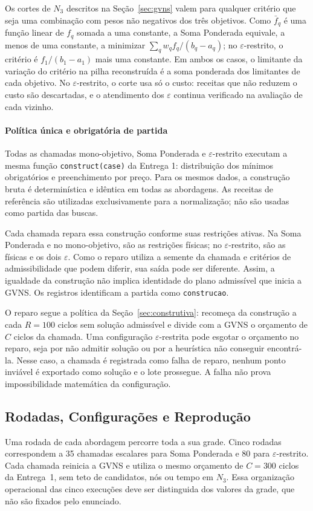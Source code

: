 \documentclass[conference]{IEEEtran}
\newcommand{\Cparada}{300}
\begin{document}
Os cortes de $N_3$ descritos na Seção~\ref{sec:gvns} valem para qualquer
critério que seja uma combinação com pesos não negativos dos três objetivos.
Como $\bar f_q$ é uma função linear de $f_q$ somada a uma constante, a Soma Ponderada equivale, a menos de uma
constante, a minimizar $\sum_q w_q f_q/(b_q-a_q)$; no $\varepsilon$-restrito,
o critério é $f_1/(b_1-a_1)$ mais uma constante. Em ambos os casos, o
limitante da variação do critério na pilha reconstruída é a soma ponderada
dos limitantes de cada objetivo. No $\varepsilon$-restrito, o corte usa só o
custo: receitas que não reduzem o custo são descartadas, e o atendimento dos
$\varepsilon$ continua verificado na avaliação de cada vizinho.

\paragraph{Política única e obrigatória de partida}
Todas as chamadas mono-objetivo, Soma Ponderada e $\varepsilon$-restrito
executam a mesma função \texttt{construct(case)} da Entrega 1: distribuição
dos mínimos obrigatórios e preenchimento por preço. Para os mesmos dados,
a construção bruta é determinística e idêntica em todas as abordagens.
As receitas de referência são utilizadas exclusivamente para a normalização;
não são usadas como partida das buscas.

Cada chamada repara essa construção conforme suas restrições ativas.
Na Soma Ponderada e no mono-objetivo, são as restrições físicas; no
$\varepsilon$-restrito, são as físicas e os dois $\varepsilon$.
Como o reparo utiliza a semente da chamada e critérios de admissibilidade
que podem diferir, sua saída pode ser diferente. Assim, a igualdade da
construção não implica identidade do plano admissível que inicia a GVNS.
Os registros identificam a partida como \texttt{construcao}.

O reparo segue a política da Seção~\ref{sec:construtiva}: recomeça da
construção a cada $R=100$ ciclos sem solução admissível e divide com a GVNS
o orçamento de $C$ ciclos da chamada. Uma configuração $\varepsilon$-restrita
pode esgotar o orçamento no reparo, seja por não admitir solução ou por a
heurística não conseguir encontrá-la. Nesse caso, a chamada é registrada como
falha de reparo, nenhum ponto inviável é exportado como solução e o lote
prossegue. A falha não prova impossibilidade matemática da configuração.

\subsection{Rodadas, Configurações e Reprodução}
Uma rodada de cada abordagem percorre toda a sua grade. Cinco rodadas
correspondem a 35 chamadas escalares para Soma Ponderada e 80 para
$\varepsilon$-restrito. Cada chamada reinicia a GVNS e utiliza o mesmo orçamento de
$C=\Cparada$ ciclos da Entrega~1, sem teto de candidatos, nós ou tempo em $N_3$.
Essa organização operacional das cinco execuções deve ser distinguida dos
valores da grade, que não são fixados pelo enunciado.
\end{document}
